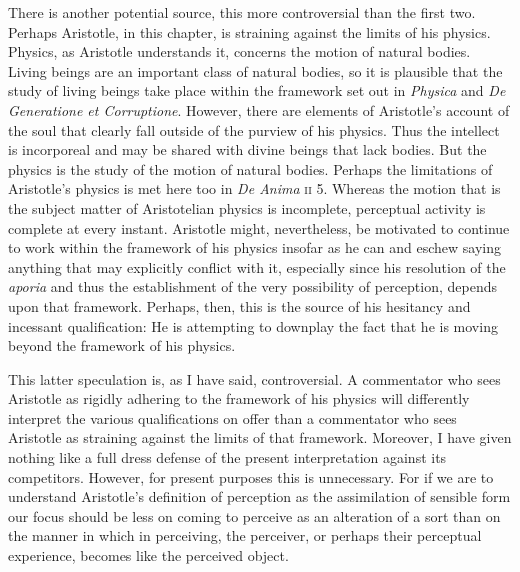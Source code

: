 There is another potential source, this more controversial than the first two. Perhaps Aristotle, in this chapter, is straining against the limits of his physics. Physics, as Aristotle understands it, concerns the motion of natural bodies. Living beings are an important class of natural bodies, so it is plausible that the study of living beings take place within the framework set out in \emph{Physica} and \emph{De Generatione et Corruptione}. However, there are elements of Aristotle's account of the soul that clearly fall outside of the purview of his physics. Thus the intellect is incorporeal and may be shared with divine beings that lack bodies. But the physics is the study of the motion of natural bodies. Perhaps the limitations of Aristotle's physics is met here too in \emph{De Anima} \textsc{ii} 5. Whereas the motion that is the subject matter of Aristotelian physics is incomplete, perceptual activity is complete at every instant. Aristotle might, nevertheless, be motivated to continue to work within the framework of his physics insofar as he can and eschew saying anything that may explicitly conflict with it, especially since his resolution of the \emph{aporia} and thus the establishment of the very possibility of perception, depends upon that framework. Perhaps, then, this is the source of his hesitancy and incessant qualification: He is attempting to downplay the fact that he is moving beyond the framework of his physics. 

This latter speculation is, as I have said, controversial. A commentator who sees Aristotle as rigidly adhering to the framework of his physics will differently interpret the various qualifications on offer than a commentator who sees Aristotle as straining against the limits of that framework. Moreover, I have given nothing like a full dress defense of the present interpretation against its competitors. However, for present purposes this is unnecessary. For if we are to understand Aristotle's definition of perception as the assimilation of sensible form our focus should be less on coming to perceive as an alteration of a sort than on the manner in which in perceiving, the perceiver, or perhaps their perceptual experience, becomes like the perceived object.




